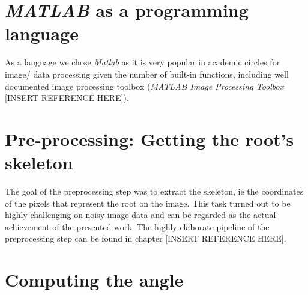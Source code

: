 \section{\textit{MATLAB} as a programming language}

As a language we chose \textit{Matlab} as it is very popular in academic circles for image/ data processing given the number of built-in functions, including well documented image processing toolbox (\textit{MATLAB Image Processing Toolbox} [INSERT REFERENCE HERE]).


\section{Pre-processing: Getting the root's skeleton}

The goal of the preprocessing step was to extract the skeleton, ie the coordinates of the pixels that represent the root on the image.
This task turned out to be highly challenging on noisy image data and can be regarded as the actual achievement of the presented work. The highly elaborate pipeline of the preprocessing step can be found in chapter [INSERT REFERENCE HERE].




\section{Computing the angle}

